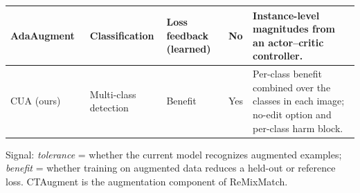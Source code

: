 \begin{table}[t]
\begin{tabularx}{\textwidth}{@{}p{}p{}p{}p{}Y@{}}
AdaAugment~\cite{yang2025adaaugment} & Classification & Loss feedback (learned) & No & Instance-level magnitudes from an actor--critic controller. \\
\midrule
CUA (ours) & Multi-class detection & Benefit & Yes & Per-class benefit combined over the classes in each image; no-edit option and per-class harm block. \\
\bottomrule
\end{tabularx}
\vspace{3pt}
\begin{minipage}{\textwidth}
\footnotesize
Signal: \emph{tolerance} = whether the current model recognizes augmented examples; \emph{benefit} = whether training on augmented data reduces a held-out or reference loss. CTAugment is the augmentation component of ReMixMatch.
\end{minipage}
\end{table}
